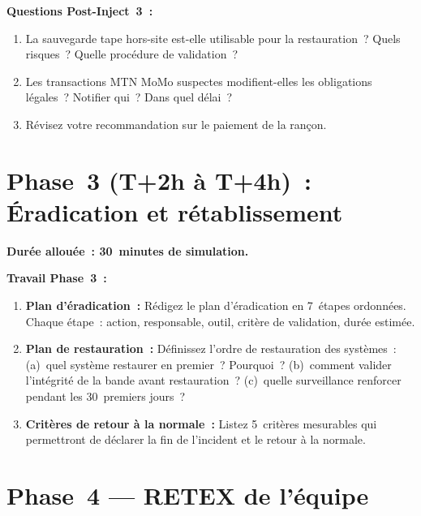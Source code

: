 \begin{boxexo}
\textbf{Questions Post-Inject~3~:}
\begin{enumerate}
  \item La sauvegarde tape hors-site est-elle utilisable pour la
    restauration~? Quels risques~? Quelle procédure de validation~?
  \item Les transactions MTN MoMo suspectes modifient-elles les
    obligations légales~? Notifier qui~? Dans quel délai~?
  \item Révisez votre recommandation sur le paiement de la rançon.
\end{enumerate}
\end{boxexo}


\section{Phase~3 (T+2h à T+4h)~: Éradication et rétablissement}
\label{lab3:phase3}

\textbf{Durée allouée~: 30~minutes de simulation.}

\begin{boxexo}
\textbf{Travail Phase~3~:}

\begin{enumerate}
  \item \textbf{Plan d'éradication~:}
    Rédigez le plan d'éradication en 7~étapes ordonnées. Chaque étape~:
    action, responsable, outil, critère de validation, durée estimée.

  \item \textbf{Plan de restauration~:}
    Définissez l'ordre de restauration des systèmes~:
    (a)~quel système restaurer en premier~? Pourquoi~?
    (b)~comment valider l'intégrité de la bande avant restauration~?
    (c)~quelle surveillance renforcer pendant les 30~premiers jours~?

  \item \textbf{Critères de retour à la normale~:}
    Listez 5~critères mesurables qui permettront de déclarer
    la fin de l'incident et le retour à la normale.
\end{enumerate}
\end{boxexo}


\section{Phase~4 — RETEX de l'équipe}
\label{lab3:retex}

